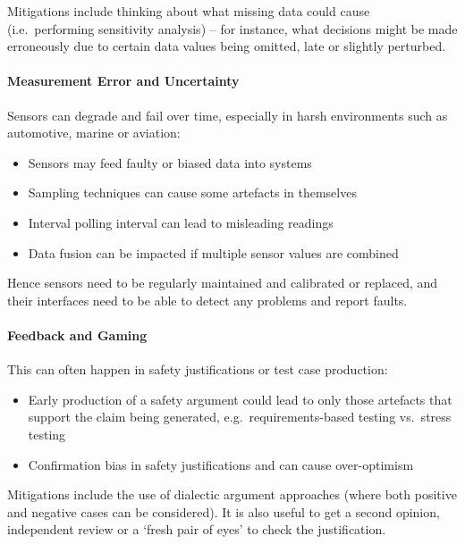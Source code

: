 Mitigations include thinking about what missing data could cause (i.e.\ performing sensitivity analysis) -- for instance, what decisions might be made erroneously due to certain data values being omitted, late or slightly perturbed.

\paragraph{Measurement Error and Uncertainty}\label{bkm:dark10}
Sensors can degrade and fail over time, especially in harsh environments such as automotive, marine or aviation:
\begin{itemize}
\item Sensors may feed faulty or biased data into systems
  \item Sampling techniques can cause some artefacts in themselves
  \item Interval polling interval can lead to misleading readings
  \item Data fusion can be impacted if multiple sensor values are combined
\end{itemize}

Hence sensors need to be regularly maintained and calibrated or replaced, and their interfaces need to be able to detect any problems and report faults. 

\paragraph{Feedback and Gaming}\label{bkm:dark11}
This can often happen in safety justifications or test case production:
\begin{itemize}
\item Early production of a safety argument could lead to only those artefacts that support the claim being generated, e.g.\ requirements-based testing vs.\ stress testing
  \item Confirmation bias in safety justifications and can cause over-optimism
\end{itemize}

Mitigations include the use of dialectic argument approaches (where both positive and negative cases can be considered). It is also useful to get a second opinion, independent review or a ‘fresh pair of eyes’ to check the justification.

